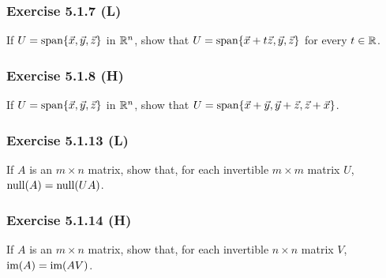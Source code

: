 \documentclass[pdf,9pt,t]{beamer}
\date{\S Review session for test III}
\begin{document}







\begin{frame}[fragile]
    \frametitle{Exercise 5.1.7 (L)}
    \begin{problem}
	If $U=\mbox{span}\{\vec{x},\vec{y},\vec{z}\}$ in $\mathbb{R}^n$, show that
	$U=\mbox{span}\{\vec{x}+t \vec{z}, \vec{y}, \vec{z}\}$ for every $t\in \mathbb{R}$.
    \end{problem}

\end{frame}
\begin{frame}[fragile]
    \frametitle{Exercise 5.1.8 (H)}
    \begin{problem}
	If $U=\mbox{span}\{\vec{x},\vec{y},\vec{z}\}$ in $\mathbb{R}^n$, show that
	$U=\mbox{span}\{\vec{x}+\vec{y}, \vec{y}+\vec{z},\vec{z}+\vec{x}\}$.
    \end{problem}

\end{frame}
\begin{frame}[fragile]
    \frametitle{Exercise 5.1.13 (L)}
    \begin{problem}
	If $A$ is an $m\times n$ matrix, show that, for each invertible $m\times m$ matrix $U$,
	$\mbox{null}(A)=\mbox{null}(U A)$.
    \end{problem}

\end{frame}
\begin{frame}[fragile]
    \frametitle{Exercise 5.1.14 (H)}
    \begin{problem}
	If $A$ is an $m\times n$ matrix, show that, for each invertible $n\times n$ matrix $V$,
	$\mbox{im}(A)=\mbox{im}(AV)$.
    \end{problem}

\end{frame}
\end{document}
